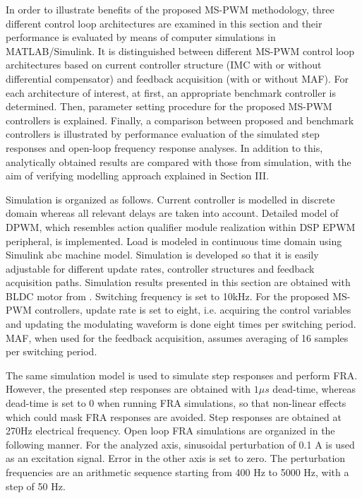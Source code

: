 \documentclass[journal]{IEEEtran}
\begin{document}
In order to illustrate benefits of the proposed MS-PWM methodology, three different control loop architectures are examined in this section and their performance is evaluated by means of computer simulations in MATLAB/Simulink.  It is distinguished between different MS-PWM control loop architectures based on current controller structure (IMC with or without differential compensator) and feedback acquisition (with or without MAF). For each architecture of interest, at first, an appropriate benchmark controller is determined. Then, parameter setting procedure for the proposed MS-PWM controllers is explained. Finally, a comparison between proposed and benchmark controllers is illustrated by performance evaluation of the simulated step responses and open-loop frequency response analyses. In addition to this, analytically obtained results are compared with those from simulation, with the aim of verifying modelling approach explained in Section III. \par
Simulation is organized as follows. Current controller is modelled in discrete domain whereas all relevant delays are taken into account. Detailed model of DPWM, which resembles action qualifier module realization within DSP EPWM peripheral, is implemented.  Load is modeled in continuous time domain using Simulink abc machine model. Simulation is developed so that it is easily adjustable for different update rates, controller structures and feedback acquisition paths. Simulation results presented in this section are obtained with BLDC motor from \cite{vuksa2016}.  Switching frequency is set to 10kHz. For the proposed MS-PWM controllers, update rate is set to eight, i.e. acquiring the control variables and updating the modulating waveform is done eight times per switching period. MAF, when used for the feedback acquisition, assumes averaging of 16 samples per switching period. \par
The same simulation model is used to simulate step responses and perform FRA. However, the presented step responses are obtained with $1\mu s$ dead-time, whereas dead-time is set to $0$ when running FRA simulations, so that non-linear effects which could mask FRA responses are avoided. Step responses are obtained at 270Hz electrical frequency. Open loop FRA simulations are organized in the following manner. For the analyzed axis, sinusoidal perturbation of 0.1 A is used as an excitation signal. Error in the other axis is set to zero. The perturbation frequencies are an arithmetic sequence starting from 400 Hz to 5000 Hz, with a step of 50 Hz.\par
\end{document}
